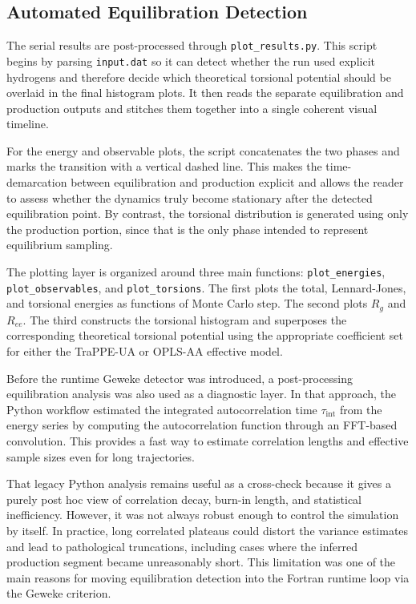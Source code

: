 \subsection{Automated Equilibration Detection}

The serial results are post-processed through \texttt{plot\_results.py}.
This script begins by parsing \texttt{input.dat} so it can detect
whether the run used explicit hydrogens and therefore decide which
theoretical torsional potential should be overlaid in the final
histogram plots. It then reads the separate equilibration and production
outputs and stitches them together into a single coherent visual
timeline.

For the energy and observable plots, the script concatenates the two
phases and marks the transition with a vertical dashed line. This makes
the time-demarcation between equilibration and production explicit and
allows the reader to assess whether the dynamics truly become stationary
after the detected equilibration point. By contrast, the torsional
distribution is generated using only the production portion, since that
is the only phase intended to represent equilibrium sampling.

The plotting layer is organized around three main functions:
\texttt{plot\_energies}, \texttt{plot\_observables}, and
\texttt{plot\_torsions}. The first plots the total, Lennard-Jones, and
torsional energies as functions of Monte Carlo step. The second plots
\(R_g\) and \(R_{ee}\). The third constructs the torsional histogram and
superposes the corresponding theoretical torsional potential using the
appropriate coefficient set for either the TraPPE-UA or OPLS-AA
effective model.

Before the runtime Geweke detector was introduced, a post-processing
equilibration analysis was also used as a diagnostic layer. In that
approach, the Python workflow estimated the integrated autocorrelation
time \(\tau_{\mathrm{int}}\) from the energy series by computing the
autocorrelation function through an FFT-based convolution. This
provides a fast way to estimate correlation lengths and effective sample
sizes even for long trajectories.

That legacy Python analysis remains useful as a cross-check because it
gives a purely post hoc view of correlation decay, burn-in length, and
statistical inefficiency. However, it was not always robust enough to
control the simulation by itself. In practice, long correlated plateaus
could distort the variance estimates and lead to pathological
truncations, including cases where the inferred production segment
became unreasonably short. This limitation was one of the main reasons
for moving equilibration detection into the Fortran runtime loop via the
Geweke criterion.

